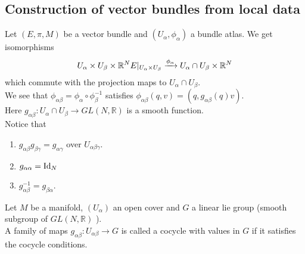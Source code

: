 \documentclass[../main.tex]{subfiles}
\begin{document}
\subsection{Construction of vector bundles from local data}
Let $( E,\pi,M) $ be a vector bundle and $( U_\alpha,\phi_\alpha) $ a bundle atlas.
We get isomorphisms
\[ 
U_\alpha\times U_\beta \times \mathbb{R}^N	E|_{U_\alpha\times U_\beta} \xrightarrow{\phi_\alpha} U_\alpha\cap U_\beta \times \mathbb{R}^N
\]
which commute with the projection maps to $U_\alpha\cap U_\beta$.\\
We see that $\phi_{\alpha\beta} = \phi_\alpha \circ \phi_\beta^{-1}$ satisfies $\phi_{\alpha\beta} ( q,v) = ( q, g_{\alpha\beta} ( q) v) $.\\
Here $g_{\alpha\beta}: U_\alpha\cap U_\beta \to GL( N, \mathbb{R}) $ is a smooth function.\\
Notice that
\begin{enumerate}
\item $g_{\alpha\beta} g_{\beta\gamma} = g_{\alpha\gamma} $ over $U_{\alpha\beta\gamma} $.
\item $g_{\alpha\alpha} = \operatorname{Id}_N$ 
\item $g_{\alpha\beta}^{-1}= g_{\beta\alpha} $.
\end{enumerate}
\begin{defn}
	Let $M$ be a manifold, $( U_\alpha) $ an open cover and $G$ a linear lie group (smooth subgroup of $GL( N, \mathbb{R}) $ ).\\
	A family of maps $g_{\alpha\beta} : U_{\alpha\beta} \to G$ is called a cocycle with values in $G$ if it satisfies the cocycle conditions.
\end{defn}
\end{document}
